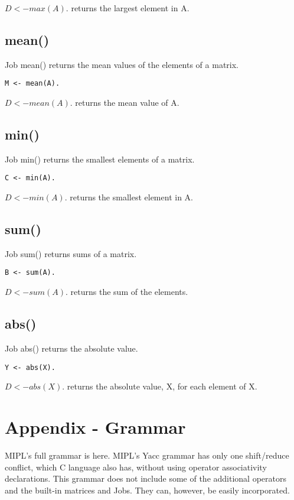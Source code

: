 \documentclass[prodmode,acmtecs]{acmsmall}
\begin{document}
$D <- max(A).$ returns the largest element in A.
\medskip

\subsection{mean()}
Job mean() returns the mean values of the elements of a matrix.
\begin{lstlisting}
M <- mean(A).
\end{lstlisting}

$D <- mean(A).$ returns the mean value of A.
\medskip

\subsection{min()}
Job min() returns the smallest elements of a matrix.
\begin{lstlisting}
C <- min(A).
\end{lstlisting}

$D <- min(A).$ returns the smallest element in A.
\medskip

\subsection{sum()}
Job sum() returns sums of a matrix.
\begin{lstlisting}
B <- sum(A).
\end{lstlisting}

$D <- sum(A).$ returns the sum of the elements.
\medskip

\subsection{abs()}
Job abs() returns the absolute value.
\begin{lstlisting}
Y <- abs(X).
\end{lstlisting}

$D <- abs(X).$ returns the absolute value, X, for each element of X.
\medskip

\bigskip
\bigskip
\bigskip
\bigskip

\section*{Appendix - Grammar}

MIPL's full grammar is here. MIPL's Yacc grammar has only one
shift/reduce conflict, which C language also has, without using
operator associativity declarations. This grammar does not 
include some of the additional operators and the built-in matrices
and Jobs. They can, however, be easily incorporated.
\end{document}

